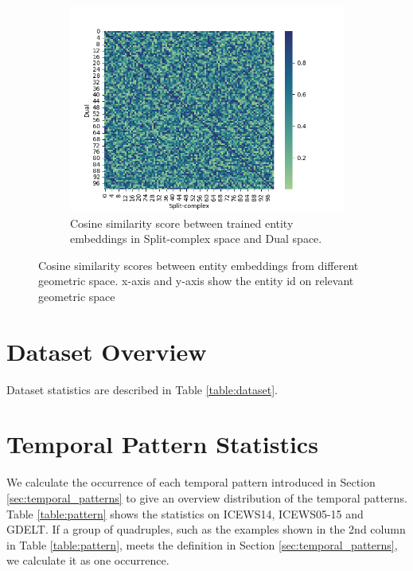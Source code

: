 \documentclass[letterpaper]{article} %
\begin{document}
\begin{figure}
\begin{subfigure}[b]{0.48\textwidth}
         \label{fig:complex_dual}
     \end{subfigure}
     \hfill
          \begin{subfigure}[b]{0.48\textwidth}
         \centering
          \includegraphics[width=\textwidth]{split_dual.png}
         \caption{Cosine similarity score between trained entity embeddings in Split-complex space and Dual space.}
         \label{fig:split_dual}
     \end{subfigure}
     \hfill
        \caption{Cosine similarity scores between entity embeddings from different geometric space. x-axis and y-axis show the entity id on relevant geometric space}
        \label{fig:cosine_similarity}
\end{figure}


\section{Dataset Overview}
\label{sec:dataset}

Dataset statistics are described in Table \ref{table:dataset}. 

\section{Temporal Pattern Statistics}
We calculate the occurrence of each temporal pattern introduced in Section \ref{sec:temporal_patterns} to give an overview distribution of the temporal patterns. Table \ref{table:pattern} shows the statistics on ICEWS14, ICEWS05-15 and GDELT. If a group of quadruples, such as the examples shown in the 2nd column in Table \ref{table:pattern}, meets the definition in Section \ref{sec:temporal_patterns}, we calculate it as one occurrence. 
\end{document}
